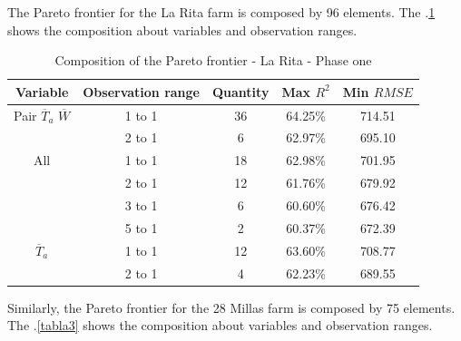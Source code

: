 \documentclass[review]{elsarticle}
\begin{document}
The Pareto frontier for the La Rita farm is composed by 96 elements. The \tablename $.$\ref{tabla2} shows the composition about variables and observation ranges.

\begin{table}[h] 
\caption{Composition of the Pareto frontier - La Rita - Phase one} 
\label{tabla2} 
\centering
\begin{tabular}{c|c|c|c|c} 
\hline
\bfseries Variable & \bfseries Observation range & \bfseries Quantity & \bfseries Max $R^2$ & \bfseries Min $RMSE$\\ 
\hline\hline 
Pair $\overline{T}_{a}$ $\overline{W}$ &	1 to 1  & 36 & 64.25\% & 714.51 \\
 &	2 to 1  & 6 & 62.97\% & 695.10 \\
\hline 
All  & 1 to 1  & 18 & 62.98\% & 701.95 \\
   & 2 to 1  & 12 & 61.76\% & 679.92 \\
    & 3 to 1  & 6 & 60.60\% & 676.42 \\
    & 5 to 1  &  2 & 60.37\% & 672.39 \\
\hline    
$\overline{T}_{a}$ & 1 to 1  & 12  & 63.60\% & 708.77 \\
       &	2 to 1  & 4 & 62.23\% & 689.55 \\
\hline
\end{tabular} 
\end{table}

Similarly, the Pareto frontier for the 28 Millas farm is composed by 75 elements. The \tablename $.$\ref{tabla3} shows the composition about variables and observation ranges.
\end{document}
